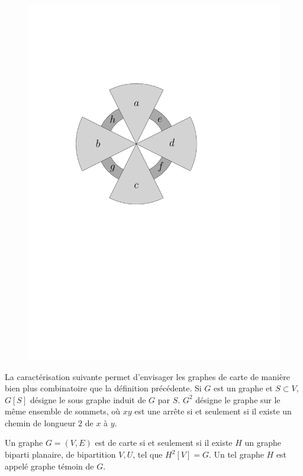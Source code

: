 \documentclass{scrartcl}
\begin{document}
\begin{flushleft}
\begin{figure}[h]
\begin{center}
    \hspace*{1cm}
    \includegraphics*[page=\ipeFigfirsttemoin, scale = 0.38]{figs}
    \end{center}
\end{figure}

La caractérisation suivante permet d'envisager les graphes de carte de manière bien plus combinatoire que la définition précédente.
Si $G$ est un graphe et $S \subset V$, $G[S]$ désigne le sous graphe induit de $G$ par $S$. $G^2$ désigne le graphe sur le même
ensemble de sommets, où $xy$ est une arrête si et seulement si il existe un chemin de longueur $2$ de $x$ à $y$.

\begin{theorem}\label{carCarte}
    Un graphe $G = (V, E)$ est de carte si et seulement si il existe $H$ un graphe biparti planaire, de bipartition $V, U$,
    tel que $H^2[V] = G$. Un tel graphe $H$ est appelé graphe témoin de $G$.
\end{theorem}


\end{flushleft}
\end{document}
